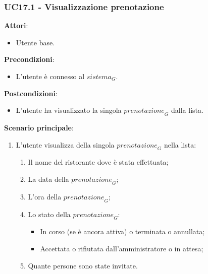 \subsubsection{UC17.1 - Visualizzazione prenotazione}\label{usecase:17_1}
\textbf{Attori}:
\begin{itemize}
    \item Utente base.
\end{itemize}
\textbf{Precondizioni}:
\begin{itemize}
    \item L'utente è connesso al $\textit{sistema}_G$.
\end{itemize}
\textbf{Postcondizioni}:
\begin{itemize}
    \item L'utente ha visualizzato la singola $\textit{prenotazione}_G$ dalla lista.
\end{itemize}
\textbf{Scenario principale}:
\begin{enumerate}
    \item L'utente visualizza della singola $\textit{prenotazione}_G$ nella lista:
    \begin{enumerate}
        \item Il nome del ristorante dove è stata effettuata;
        \item La data della $\textit{prenotazione}_G$;
        \item L'ora della $\textit{prenotazione}_G$;
        \item Lo stato della $\textit{prenotazione}_G$:
            \begin{itemize}
                \item In corso (se è ancora attiva) o terminata  o annullata;
                \item Accettata o rifiutata dall'amministratore o in attesa;
            \end{itemize}
        \item Quante persone sono state invitate.
    \end{enumerate}
\end{enumerate}
\newpage